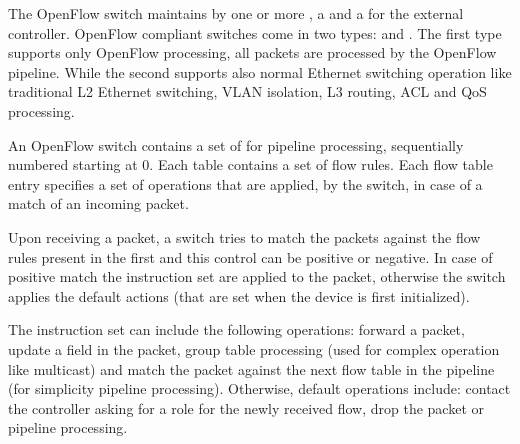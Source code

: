 The OpenFlow switch \cite{onf:openflow-specifications:switch-component} maintains by one or more , a  and a  for the external controller. OpenFlow compliant switches come in two types:  and . The first type supports only OpenFlow processing, all packets are processed by the OpenFlow pipeline. While the second supports also normal Ethernet switching operation like traditional L2 Ethernet switching, \acs{VLAN} isolation, L3 routing, \acs{ACL} and \ac{QoS} processing.

An OpenFlow switch contains a set of  for pipeline processing, sequentially numbered starting at 0. Each table contains a set of flow rules. Each flow table entry specifies a set of operations that are applied, by the switch, in case of a match of an incoming packet.

Upon receiving a packet, a switch tries to match the packets against the flow rules present in the first  and this control can be positive or negative. In case of positive match the instruction set are applied to the packet, otherwise the switch applies the default actions (that are set when the device is first initialized).

The instruction set can include the following operations: forward a packet, update a field in the packet, group table processing (used for complex operation like multicast) and match the packet against the next flow table in the pipeline (for simplicity pipeline processing). Otherwise, default operations include: contact the controller asking for a role for the newly received flow, drop the packet or pipeline processing.